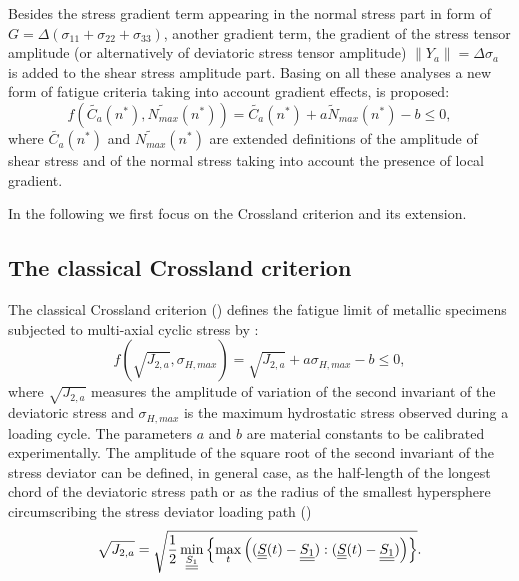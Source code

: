 Besides the stress gradient term appearing in the normal stress part in form of $G=\Delta(\sigma_{11}+\sigma_{22}+\sigma_{33})$, another gradient term, the gradient of the stress tensor amplitude (or alternatively of deviatoric stress tensor amplitude) $\parallel{Y}_a\parallel={\Delta\sigma}_a$ is added to the shear stress amplitude part. Basing on all these analyses a new form of fatigue criteria taking into account gradient effects, is proposed:
\begin{equation}
	f(\widetilde{C_a}(n^*),\widetilde{N_{max}}(n^*))=\widetilde{C_a}(n^*)+a\widetilde{N}_{max}(n^*)-b\leqslant 0 ,
	\label{eq:gradient crossland}
\end{equation}
where $\widetilde{C_a}(n^*)$ and $\widetilde{N_{max}}(n^*)$ are extended definitions of the amplitude of shear stress and of the normal stress taking into account the presence of local gradient.

In the following we first focus on the Crossland criterion and its extension.

\subsection{The classical Crossland criterion}

The classical Crossland criterion (\cite{crossland1956effect}) defines the fatigue limit of metallic specimens subjected to multi-axial cyclic stress  by : 
\begin{equation}
	f(\sqrt{J_{2,a}},\sigma_{H,max})=\sqrt{J_{2,a}}+a\sigma_{H,max}-b\leqslant 0,\label{eq:crossland}
\end{equation}
where $\sqrt{J_{2,a}}$ measures  the amplitude of variation of the second invariant of the deviatoric stress  and $\sigma_{H,max}$ is the maximum hydrostatic stress observed during a loading cycle. The parameters $a$ and $b$ are material constants to be calibrated experimentally. The amplitude of the square root of the second invariant of the stress deviator can be defined, in general case, as the half-length of the longest chord of the deviatoric stress path or as the radius of the smallest hypersphere circumscribing the stress deviator loading path (\cite{Papadopoulos1997219})
\begin{equation}\sqrt{J_{2,a}}=\sqrt{\frac{1}{2}\min \limits_{\uline{\uline{S_1}}}\left\lbrace \max \limits_{t}\left( (\uline{\uline{S}}(t)-\uline{\uline{S_1}}):(\uline{\uline{S}}(t)-\uline{\uline{S_1}})\right) \right\rbrace }.\end{equation}

